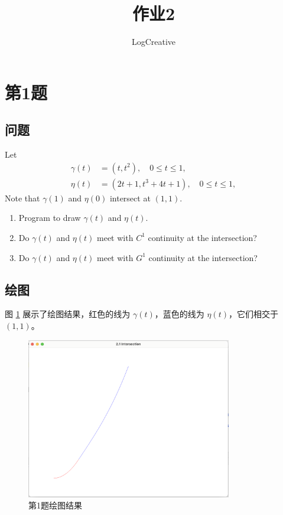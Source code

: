 \documentclass[math-font=newcm]{sjtuarticle}
\title{作业2}
\author{LogCreative}
\begin{document}
\maketitle

\tableofcontents*
\clearpage

\section{第1题}

\subsection{问题}
Let
\begin{align*}
    \gamma(t)&=(t,t^2),\quad 0\leq t\leq 1,\\
    \eta(t)&=(2t+1,t^3+4t+1),\quad 0\leq t\leq 1,
\end{align*}
Note that $\gamma(1)$ and $\eta(0)$ intersect at $(1,1)$.
\begin{enumerate}
    \item Program to draw $\gamma(t)$ and $\eta(t)$.
    \item Do $\gamma(t)$ and $\eta(t)$ meet with $C^1$ continuity at the intersection?
    \item Do $\gamma(t)$ and $\eta(t)$ meet with $G^1$ continuity at the intersection?
\end{enumerate}

\subsection{绘图}

图 \ref{fig:p1} 展示了绘图结果，红色的线为 $\gamma(t)$，蓝色的线为 $\eta(t)$，它们相交于 $(1,1)$。

\begin{figure}[h]
    \centering
    \includegraphics[width=0.8\textwidth]{p1.png}
    \caption{第1题绘图结果}
    \label{fig:p1}
\end{figure}
\end{document}
